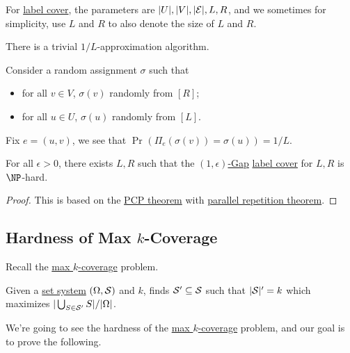 For \hyperref[prb:label-cover]{label cover}, the parameters are \(\vert U \vert, \vert V \vert , \vert \mathcal{\MakeUppercase{e}}  \vert , L, R\), and we sometimes for simplicity, use \(L\) and \(R\) to also denote the size of \(L\) and \(R\).

\begin{remark}[Baseline]
	There is a trivial \(1/L\)-approximation algorithm.
\end{remark}
\begin{explanation}
	Consider a random assignment \(\sigma \) such that
	\begin{itemize}
		\item for all \(v\in V\), \(\sigma (v)\) randomly from \([R]\);
		\item for all \(u\in U\), \(\sigma (u)\) randomly from \([L]\).
	\end{itemize}
	Fix \(e=(u, v)\), we see that \(\Pr_{}(\Pi _e(\sigma (v)) = \sigma (u)) = 1 / L \).
\end{explanation}

\begin{theorem}\label{thm:label-cover}
	For all \(\epsilon > 0\), there exists \(L, R\) such that the \hyperref[def:c-s-Gap]{\((1, \epsilon )\)-Gap} \hyperref[prb:label-cover]{label cover} for \(L, R\) is \(\NP\)-hard.
\end{theorem}
\begin{proof}
	This is based on the \hyperref[thm:PCP]{PCP theorem} with \href{https://www.wisdom.weizmann.ac.il/~/ranraz/publications/Pparrepsur.pdf}{parallel repetition theorem}.
\end{proof}

\subsection{Hardness of Max \(k\)-Coverage}
Recall the \hyperref[prb:max-k-coverage]{max \(k\)-coverage} problem.

\begin{problem}\label{prb:max-k-coverage}
Given a \hyperref[def:set-system]{set system} \((\Omega , \mathcal{\MakeUppercase{s}}) \) and \(k\), finds \(\mathcal{\MakeUppercase{s}} ^\prime \subseteq \mathcal{\MakeUppercase{s}} \) such that \(\vert \mathcal{\MakeUppercase{s}}\vert ^\prime = k\) which maximizes \(\vert \bigcup_{S\in \mathcal{\MakeUppercase{S}} ^\prime } S \vert / \vert \Omega \vert \).
\end{problem}

We're going to see the hardness of the \hyperref[prb:max-k-coverage]{max \(k\)-coverage} problem, and our goal is to prove the following.


